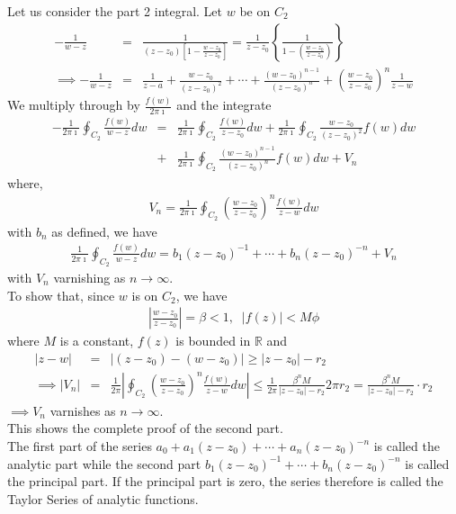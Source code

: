 \documentclass[11pt]{report}
\newcommand{\sps}{\\[0.2cm]}
\newcommand{\dsp}{\displaystyle}
\newcommand{\NI}{\noindent}
\newcommand{\real}{ \mathbb{R}}
\newcommand{\imaginary}{\imath}
\begin{document}
	\NI Let us consider the part 2 integral. Let $w$ be on $C_2$
	\begin{eqnarray*}
		-\frac{1}{w-z} &=& \frac{1}{\left(z-z_0\right)\left[1-\frac{w-z_0}{z-z_0}\right] } = \frac{1}{z-z_0}\left\{\frac{1}{1-\left(\frac{w-z_0}{z-z_0}\right)}\right\}\sps
		\implies -\frac{1}{w-z}&=& \frac{1}{z-a}+ \frac{w-z_0}{(z-z_0)^2} + \cdots + \frac{(w-z_0)^{n-1}}{(z-z_0)^n}+\left( \frac{w-z_0}{z-z_0} \right)^n\frac{1}{z-w}
	\end{eqnarray*}
	We multiply through by $\dsp \frac{f(w)}{2\pi\imaginary}$ and the integrate
	\begin{eqnarray*}
		-\frac{1}{2\pi\imaginary}\oint_{C_2}\frac{f(w)}{w-z}dw &=& \frac{1}{2\pi\imaginary}\oint_{C_2}\frac{f(w)}{z-z_0}dw + \frac{1}{2\pi\imaginary}\oint_{C_2}\frac{w-z_0}{(z-z_0)^2}f(w)dw\sps
		&+&\frac{1}{2\pi\imaginary}\oint_{C_2}\frac{(w-z_0)^{n-1}}{(z-z_0)^n}f(w)dw + V_n
	\end{eqnarray*}
	where,
	\begin{eqnarray*}
		V_n = \frac{1}{2\pi\imaginary}\oint_{C_2}\left( \frac{w-z_0}{z-z_0} \right)^n \frac{f(w)}{z-w}dw
	\end{eqnarray*}
	with $b_n$ as defined, we have
	\begin{eqnarray*}
		\frac{1}{2\pi\imaginary}\oint_{C_2}\frac{f(w)}{w-z}dw = b_1(z-z_0)^{-1} + \cdots + b_n(z-z_0)^{-n} + V_n
	\end{eqnarray*}
	with $V_n$ varnishing as $n\rightarrow\infty$.\\
	To show that, since $w$ is on $C_2$, we have
	\begin{eqnarray*}
		\left| \frac{w-z_0}{z - z_0} \right| = \beta < 1,\;\; |f(z)| < M\phi
	\end{eqnarray*}
	where $M$ is a constant, $f(z)$ is bounded in $\real$ and 
	\begin{eqnarray*}
		|z-w| &=& |(z-z_0) - (w-z_0) | \geq |z-z_0| - r_2\sps
		\implies |V_n| &=&\frac{1}{2\pi}\left| \oint_{C_2}\left( \frac{w-z_0}{z-z_0} \right)^n \frac{f(w)}{z-w} dw \right| \leq \frac{1}{2\pi}\frac{\beta^n M}{|z-z_0|-r_2} 2\pi r_2 = \frac{\beta^n M}{|z-z_0|-r_2} \cdot r_2 
	\end{eqnarray*}
	$\implies V_n$ varnishes as $n\rightarrow\infty$.\\
	This shows the complete proof of the second part.\\
	
	\NI The first part of the series $a_0 + a_1(z-z_0) + \cdots + a_n(z-z_0)^{-n}$ is called the analytic part while the second part $b_1(z-z_0)^{-1} + \cdots + b_n(z-z_0)^{-n}$ is called the principal part. If the principal part is zero, the series therefore is called the Taylor Series of analytic functions.
\end{document}

